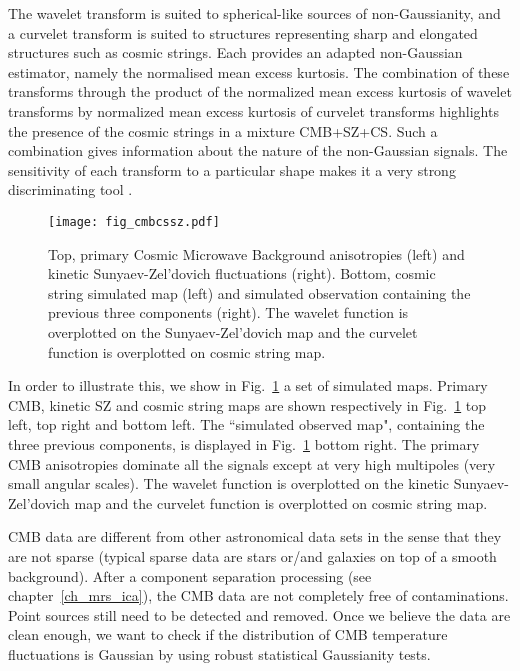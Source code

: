 The wavelet transform is suited to spherical-like sources of non-Gaussianity, and a curvelet transform is suited to structures 
representing sharp and elongated structures such as cosmic strings. Each provides an adapted non-Gaussian estimator, namely 
the normalised mean excess kurtosis. The combination of these transforms through the product of the normalized mean excess kurtosis 
of wavelet transforms by normalized mean excess kurtosis of curvelet transforms highlights the presence of the cosmic strings 
in a mixture CMB+SZ+CS. Such a combination gives information about the nature of the non-Gaussian signals. The sensitivity of 
each transform to a particular shape makes it a very strong discriminating tool \citep{starck:sta03_1,starck:jin05}.

\begin{figure}[htb]
\centering
\texttt{[image: fig\_cmbcssz.pdf]}
\caption{Top, primary Cosmic Microwave Background anisotropies (left) and kinetic Sunyaev-Zel'dovich fluctuations (right). 
Bottom, cosmic string simulated map (left) and simulated observation containing the previous three components (right). 
The wavelet function is overplotted on the Sunyaev-Zel'dovich map and the curvelet function is overplotted on cosmic string map.}
\label{fig_cmb}
\end{figure}

In order to illustrate this, we show in Fig.~\ref{fig_cmb} a set of simulated maps. Primary CMB, kinetic SZ and cosmic string 
maps are shown respectively in Fig.~\ref{fig_cmb} top left, top right and bottom left. The ``simulated observed map", containing 
the three previous components, is displayed in Fig.~\ref{fig_cmb} bottom right. The primary CMB anisotropies dominate all the 
signals except at very high multipoles (very small angular scales). The wavelet function is overplotted on the kinetic Sunyaev-Zel'dovich 
map and the curvelet function is overplotted on cosmic string map.


CMB data are different from other astronomical data sets in the sense that they are not sparse (typical sparse data are stars or/and 
galaxies on top of a smooth background). After a component separation processing (see chapter~\ref{ch_mrs_ica}), the CMB data are not 
completely free of contaminations. Point sources still need to be detected and removed. Once we believe the data are clean enough, 
we want to check if the distribution of CMB temperature fluctuations is Gaussian by using robust statistical Gaussianity tests. 


